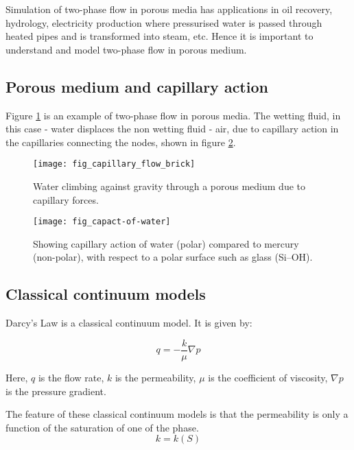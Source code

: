 Simulation of two-phase flow in porous media has applications in oil recovery, hydrology, electricity production where pressurised water is passed through heated pipes and is transformed into steam, etc. Hence it is important to understand and model two-phase flow in porous medium. \cite{labed2012experimental}

\subsection{Porous medium and capillary action}
	Figure \ref{fig_capillary_flow_brick} is an example of two-phase flow in porous media. The wetting fluid, in this case - water displaces the non wetting fluid - air, due to capillary action in the capillaries connecting the nodes, shown in figure \ref{fig_capact-of-water}.
	
	\begin{figure}[H]
		\centering
		\texttt{[image: fig\_capillary\_flow\_brick]}
		\caption{Water climbing against gravity through a porous medium due to capillary forces. \cite{wiki:Capillary_action}}
		\label{fig_capillary_flow_brick}
	\end{figure}
	
	\begin{figure}[H]
		\centering
		\texttt{[image: fig\_capact-of-water]}
		\caption{Showing capillary action of water (polar) compared to mercury (non-polar), with respect to a polar surface such as glass (Si–OH). \cite{wiki:Capillary_action}}
		\label{fig_capact-of-water}
	\end{figure}
	
\subsection{Classical continuum models}

	Darcy's Law is a classical continuum model. It is given by:
	
	\begin{equation}
		q = -\frac{k}{\mu} \nabla p
		\label{eq:basic-darcy}
	\end{equation}
	
	Here, $q$ is the flow rate,	$k$ is the permeability, $\mu$ is the coefficient of viscosity,	$\nabla p$ is the pressure gradient.
	
	The feature of these classical continuum models is that the permeability is only a function of the saturation of one of the phase.
	\begin{equation}
		k = k(S)
	\end{equation}
	
